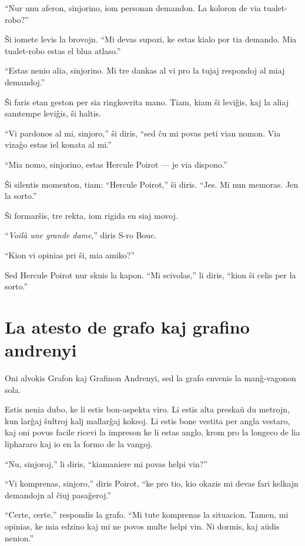 ``Nur unu aferon, sinjorino, iom personan demandon. La koloron de via tualet-robo?''

Ŝi iomete levis la brovojn. ``Mi devas supozi, ke estas kialo por tia demando. Mia tualet-robo estas el blua atlaso.''

``Estas nenio alia, sinjorino. Mi tre dankas al vi pro la tujaj respondoj al miaj demandoj.''

Ŝi faris etan geston per sia ringkovrita mano. Tiam, kiam ŝi leviĝis, kaj la aliaj samtempe leviĝis, ŝi haltis.

``Vi pardonos al mi, sinjoro,'' ŝi diris, ``sed ĉu mi povas peti vian nomon. Via vizaĝo estas iel konata al mi.''

``Mia nomo, sinjorino, estas Hercule Poirot --- je via dispono.''

Ŝi silentis momenton, tiam: ``Hercule Poirot,'' ŝi diris. ``Jes. Mi nun memoras. Jen la sorto.''

Ŝi formarŝis, tre rekta, iom rigida en siaj movoj.

``\emph{Voilà une grande dame},'' diris S-ro Bouc.

``Kion vi opinias pri ŝi, mia amiko?''

Sed Hercule Poirot nur skuis la kapon. ``Mi scivolas,'' li diris, ``kion ŝi celis per la sorto.''

\chapter[La atesto de grafo kaj grafino andrenyi]{La atesto de grafo kaj grafino andrenyi}


Oni alvokis Grafon kaj Grafinon Andrenyi, sed la grafo envenis la manĝ-vagonon sola.

Estis nenia dubo, ke li estis bon-aspekta viro. Li estis alta preskaŭ du metrojn, kun larĝaj ŝultroj kalj mallarĝaj koksoj. Li estis bone vestita per angla vestaro, kaj oni povus facile ricevi la impreson ke li estas anglo, krom pro la longeco de lia liphararo kaj io en la formo de la vangoj.

``Nu, sinjoroj,'' li diris, ``kiamaniere mi povas helpi vin?''

``Vi komprenas, sinjoro,'' diris Poirot, ``ke pro tio, kio okazis mi devas fari kelkajn demandojn al ĉiuj pasaĝeroj.''

``Certe, certe,'' respondis la grafo. ``Mi tute komprenas la situacion. Tamen, mi opinias, ke mia edzino kaj mi ne povos multe helpi vin. Ni dormis, kaj aŭdis nenion.''

